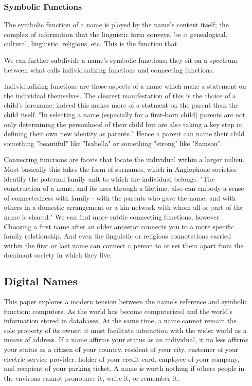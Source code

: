 \subsubsection{Symbolic Functions}

The symbolic function of a name is played by the name's content itself; the
complex of information that the linguistic form conveys, be it genealogical,
cultural, linguistic, religious, etc. This is the function that 

We can further subdivide a name's symbolic functions; they sit on a spectrum
between what \textcite{finch08} calls individualizing functions and connecting
functions.

Individualizing functions are those aspects of a name which make a statement on
the individual themselves. The clearest manifestation of this is the choice of a
child's forename; indeed this makes more of a statment on the parent than the
child itself. "In selecting a name (especially for a first-born child) parents
are not only determining the personhood of their child but are also taking a key
step in defining their own new identity as parents." \parencite[718]{finch08}
Hence a parent can name their child something "beautiful" like "Isabella" or
something "strong" like "Samson".

Connecting functions are facets that locate the individual within a larger
milieu. Most basically this takes the form of surnames, which in Anglophone
societies identify the paternal family unit to which the individual belongs.
"The construction of a name, and its uses through a lifetime, also can embody a
sense of connectedness with family - with the parents who gave the name, and
with others in a domestic arrangement or a kin network with whom all or part of
the name is shared." \parencite[711]{finch08} We can find more subtle connecting
functions, however. Choosing a first name after an older ancestor connects you
to a more specific family relationship. And even the linguistic or religious
connotations carried within the first or last name can connect a person to or
set them apart from the dominant society in which they live.

\subsection{Digital Names}

This paper explores a modern tension between the name's reference and symbolic
function: computers. As the world has become computerized and the world's
information stored in databases, At the same time, a name cannot remain the sole
property of its owner; it must facilitate interaction with the wider world as a
means of address. If a name affirms your status as an individual, it no less
affirms your status as a citizen of your country, resident of your city,
customer of your electric service provider, holder of your credit card, employee
of your company, and recipient of your parking ticket. A name is worth nothing
if others people in the environs cannot pronounce it, write it, or remember it.

